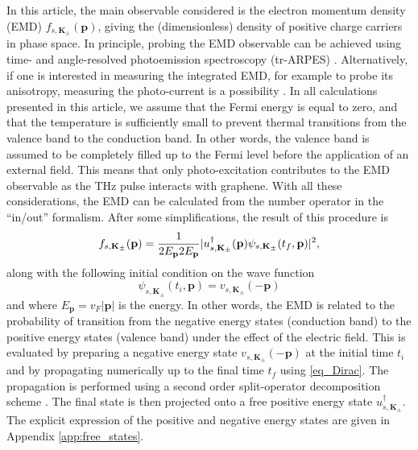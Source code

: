 \documentclass[9pt,twocolumn,twoside]{osajnl}
\begin{document}
In this article, the main observable considered is the electron momentum density (EMD) $f_{s,\mathbf{K}_{\pm}}(\mathbf{p})$, giving the (dimensionless) density of positive charge carriers in phase space.
In principle, probing the EMD observable can be achieved using time- and angle-resolved photoemission spectroscopy (tr-ARPES) \cite{PhysRevB.93.155434, PhysRevB.96.020301}. 
Alternatively, if one is interested in measuring the integrated EMD, for example to probe its anisotropy, measuring the photo-current is a possibility \cite{1367-2630-15-5-055021, Higuchi:2017fk}.
In all calculations presented in this article, we assume that the Fermi energy is equal to zero, and that the temperature is sufficiently small to prevent thermal transitions from the valence band to the conduction band.
In other words, the valence band is assumed to be completely filled up to the Fermi level before the application of an external field.
This means that only photo-excitation contributes to the EMD observable as the THz pulse interacts with graphene. 
With all these considerations, the EMD can be calculated from the number operator in the ``in/out'' formalism. After some simplifications, the result of this procedure is \cite{PhysRevB.92.035401,FillionGourdeauRussianJ2017,PhysRevB.94.125423}
%
\begin{equation}\label{eq_pairDensity}
f_{s,\mathbf{K}_{\pm}}(\mathbf{p}) = \frac{1}{2E_{\textbf{p}}2E_{\textbf{p}}}\arrowvert u_{s,\textbf{K}_{\pm}}^{\dagger}(\textbf{p}) \psi_{s,\textbf{K}_{\pm}}(t_f,\textbf{p})\arrowvert ^2,
\end{equation}
%
along with the following initial condition on the wave function
%
\begin{equation}
\psi_{s,\textbf{K}_{\pm}}(t_i,\textbf{p}) = v_{s,\textbf{K}_{\pm}}(-\mathbf{p})
\end{equation}
and where $E_{\textbf{p}} = v_{F}|\mathbf{p}|$ is the energy. In other words, the EMD is related to the probability of transition from the negative energy states (conduction band) to the positive energy states (valence band) under the effect of the electric field. This is evaluated by preparing a negative energy state $v_{s,\textbf{K}_{\pm}}(-\mathbf{p})$ at the initial time $t_i$ and by propagating numerically up to the final time $t_f$ using \eqref{eq_Dirac}. The propagation is performed using a second order split-operator decomposition scheme \cite{PhysRevB.92.035401,FillionGourdeauRussianJ2017,PhysRevB.94.125423}.
The final state is then projected onto a free positive energy state $u_{s,\textbf{K}_{\pm}}^{\dag}$. The explicit expression of the positive and negative energy states are given in Appendix \ref{app:free_states}.
\end{document}
